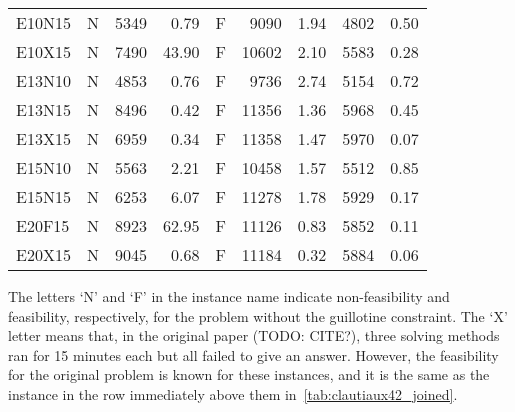 \documentclass[ppgc,tese,english,formais,babel]{iiufrgs}
\begin{document}
\begin{spacing}{1.0}
\begin{table}[H]
\begin{tabular}{lcrrcrrrr}
E10N15 & N & 5349 & 0.79 & F & 9090 & 1.94 & 4802 & 0.50 \\
E10X15 & N & 7490 & 43.90 & F & 10602 & 2.10 & 5583 & 0.28 \\
E13N10 & N & 4853 & 0.76 & F & 9736 & 2.74 & 5154 & 0.72 \\
E13N15 & N & 8496 & 0.42 & F & 11356 & 1.36 & 5968 & 0.45 \\
E13X15 & N & 6959 & 0.34 & F & 11358 & 1.47 & 5970 & 0.07 \\
E15N10 & N & 5563 & 2.21 & F & 10458 & 1.57 & 5512 & 0.85 \\
E15N15 & N & 6253 & 6.07 & F & 11278 & 1.78 & 5929 & 0.17 \\
E20F15 & N & 8923 & 62.95 & F & 11126 & 0.83 & 5852 & 0.11 \\
E20X15 & N & 9045 & 0.68 & F & 11184 & 0.32 & 5884 & 0.06 \\\hline\hline
\end{tabular}
\end{table}
\end{spacing}

The letters `N' and `F' in the instance name indicate non-feasibility and feasibility, respectively, for the problem without the guillotine constraint. The `X' letter means that, in the original paper (TODO: CITE?), three solving methods ran for 15 minutes each but all failed to give an answer. However, the feasibility for the original problem is known for these instances, and it is the same as the instance in the row immediately above them in~\autoref{tab:clautiaux42_joined}.
\end{document}
